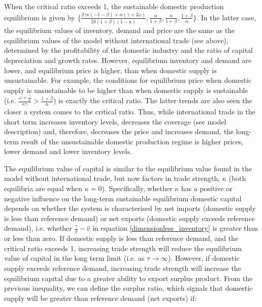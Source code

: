 \documentclass[12pt]{article}
\begin{document}
\clearpage

When the critical ratio exceeds 1, the sustainable domestic production equilibrium is given by $\{\frac{2 \gamma \kappa (- 1 - \beta) + \alpha (\gamma + 2 \omega)}{2 \delta (1+\beta)(1 - \kappa) }, \frac{\alpha}{1 + \beta}, \frac{\alpha}{1 + \beta}, \frac{1 + \beta}{\alpha}\}$. In the latter case, the equilibrium values of inventory, demand and price are the same as the equilibrium values of the model without international trade (see above), determined by the profitability of the domestic industry and the ratio of capital depreciation and growth rates. However, equilibrium inventory and demand are lower, and equilibrium price is higher, than when domestic supply is unsustainable. For example, the conditions for equilibrium price when domestic supply is unsustainable to be higher than when domestic supply is sustainable (i.e. $\frac{\omega + \frac{\gamma}{2}}{\kappa \gamma} > \frac{1 + \beta}{\alpha}$) is exactly the critical ratio. The latter trends are also seen the closer a system comes to the critical ratio. Thus, while international trade in the short term increases inventory levels, decreases the coverage (see model description) and, therefore, decreases the price and increases demand, the long-term result of the unsustainable domestic production regime is higher prices, lower demand and lower inventory levels.

The equilibrium value of capital is similar to the equilibrium value found in the model without international trade, but now factors in trade strength, $\kappa$ (both equilibria are equal when $\kappa = 0$). Specifically, whether $\kappa$ has a positive or negative influence on the long-term sustainable equilibrium domestic capital depends on whether the system is characterised by net imports (domestic supply is less than reference demand) or net exports (domestic supply exceeds reference demand), i.e. whether $\frac{\gamma}{\delta} - \hat{v}$ in equation \ref{dimensionless_inventory} is greater than or less than zero. If domestic supply is less than reference demand, and the critical ratio exceeds 1, increasing trade strength will reduce the equilibrium value of capital in the long term limit (i.e. as $\tau \rightarrow \infty$). However, if domestic supply exceeds reference demand, increasing trade strength will increase the equilibrium capital due to a greater ability to export surplus product. From the previous inequality, we can define the surplus ratio, which signals that domestic supply will be greater than reference demand (net exports) if:
\end{document}

